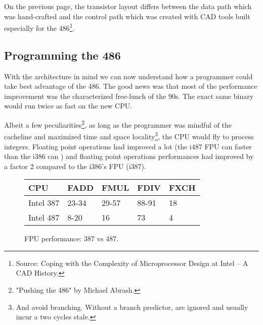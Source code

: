 \par



\begin{figure}[H]
\centering
{}
\end{figure}
\par
\begin{figure}[H]
\centering
{}
\end{figure}





On the previous page, the transistor layout differs between the data path which was hand-crafted and the control path which was created with CAD tools built especially for the 486\footnote{Source: Coping with the Complexity of Microprocessor
Design at Intel -- A CAD History.}.\\
\par
\subsection{Programming the 486}
With the architecture in mind we can now understand how a programmer could take best advantage of the 486. The good news was that most of the performance improvement was the characterized free-lunch of the 90s. The exact same binary would run twice as fast on the new CPU.\\
\par
Albeit a few peculiarities\footnote{"Pushing the 486" by Michael Abrash.}, as long as the programmer was mindful of the cacheline and maximized time and space locality\footnote{And avoid branching. Without a branch predictor,  are ignored and usually incur a two cycles stale.}, the CPU would fly to process integers. Floating point operations had improved a lot (the i487 FPU can  faster than the i386 can ) and floating point operations performances had improved by a factor 2 compared to the i386's FPU (i387).\\
\par
\begin{figure}[H]
\centering
\begin{tabularx}{\textwidth}{ X  X X  X  X}
  \toprule
  \textbf{CPU} & \textbf{FADD} & \textbf{FMUL} & \textbf{FDIV} &\textbf{FXCH} \\ \bottomrule
Intel 387 & 23-34 & 29-57   & 88-91 & 18 \\
Intel 487 & 8-20  & 16   & 73 & 4 \\ \bottomrule
\end{tabularx}
\caption{FPU performance: 387 vs 487.}

\end{figure}


